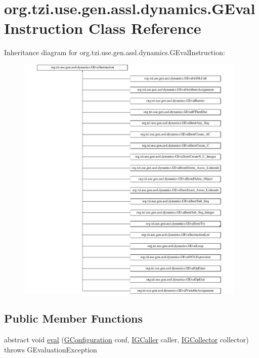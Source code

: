 \hypertarget{classorg_1_1tzi_1_1use_1_1gen_1_1assl_1_1dynamics_1_1_g_eval_instruction}{\section{org.\-tzi.\-use.\-gen.\-assl.\-dynamics.\-G\-Eval\-Instruction Class Reference}
\label{classorg_1_1tzi_1_1use_1_1gen_1_1assl_1_1dynamics_1_1_g_eval_instruction}
}
Inheritance diagram for org.\-tzi.\-use.\-gen.\-assl.\-dynamics.\-G\-Eval\-Instruction\-:\begin{figure}[H]
\begin{center}
\leavevmode
\includegraphics[height=12.000000cm]{classorg_1_1tzi_1_1use_1_1gen_1_1assl_1_1dynamics_1_1_g_eval_instruction}
\end{center}
\end{figure}
\subsection*{Public Member Functions}
\begin{DoxyCompactItemize}
\item 
abstract void \hyperlink{classorg_1_1tzi_1_1use_1_1gen_1_1assl_1_1dynamics_1_1_g_eval_instruction_ac6b8e2821d10f8416e7785629e367585}{eval} (\hyperlink{classorg_1_1tzi_1_1use_1_1gen_1_1assl_1_1dynamics_1_1_g_configuration}{G\-Configuration} conf, \hyperlink{interfaceorg_1_1tzi_1_1use_1_1gen_1_1assl_1_1dynamics_1_1_i_g_caller}{I\-G\-Caller} caller, \hyperlink{interfaceorg_1_1tzi_1_1use_1_1gen_1_1assl_1_1dynamics_1_1_i_g_collector}{I\-G\-Collector} collector)  throws G\-Evaluation\-Exception
\end{DoxyCompactItemize}
